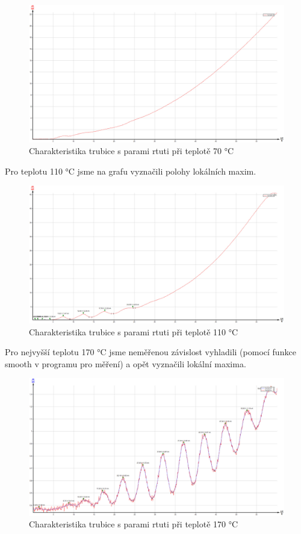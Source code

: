 \begin{figure}[!h]
    \centering
    \includegraphics[width=1\linewidth]{A16 - Frank-Hertz/Hg_70.jpg}
    \caption{Charakteristika trubice s parami rtuti při teplotě 70 °C}
    \label{fig:hg-70}
\end{figure}

Pro teplotu 110 °C jsme na grafu vyznačili polohy lokálních maxim.

\begin{figure}[!h]
    \centering
    \includegraphics[width=1\linewidth]{A16 - Frank-Hertz/Hg_110.jpg}
    \caption{Charakteristika trubice s parami rtuti při teplotě 110 °C}
    \label{fig:hg-110}
\end{figure}

Pro nejvyšší teplotu 170 °C jsme neměřenou závislost vyhladili (pomocí funkce smooth v programu pro měření) a opět vyznačili lokální maxima.

\begin{figure}[!h]
    \centering
    \includegraphics[width=1\linewidth]{A16 - Frank-Hertz/Hg_170.jpg}
    \caption{Charakteristika trubice s parami rtuti při teplotě 170 °C}
    \label{fig:hg-170}
\end{figure}

